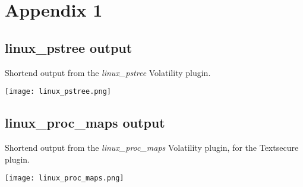 \section{Appendix 1}

\subsection{linux\_pstree output}
Shortend output from the \textit{linux\_pstree} Volatility plugin.

\texttt{[image: linux\_pstree.png]}


\subsection{linux\_proc\_maps output}
Shortend output from the \textit{linux\_proc\_maps} Volatility plugin, for the
Textsecure plugin.

\texttt{[image: linux\_proc\_maps.png]}